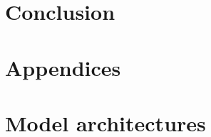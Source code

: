 \documentclass[final-report]{article-template}
\begin{document}
\section{Conclusion}


\newpage



\clearpage
\section*{Appendices}
\appendix
\section{Model architectures}
\end{document}
